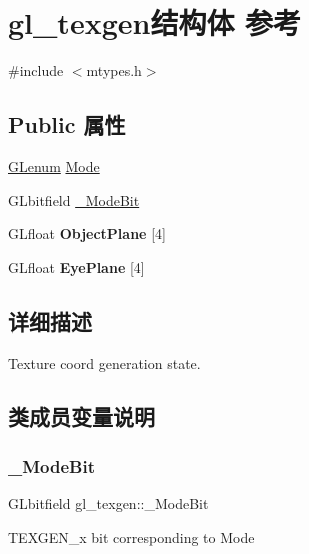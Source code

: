 \hypertarget{structgl__texgen}{}\section{gl\+\_\+texgen结构体 参考}
\label{structgl__texgen}


{\ttfamily \#include $<$mtypes.\+h$>$}

\subsection*{Public 属性}
\begin{DoxyCompactItemize}
\item 
\hyperlink{interfacevoid}{G\+Lenum} \hyperlink{structgl__texgen_affe19d424ce41dbf80035954eaa51fda}{Mode}
\item 
G\+Lbitfield \hyperlink{structgl__texgen_ae1da13c915be745053d632cd94abebc5}{\+\_\+\+Mode\+Bit}
\item 
\mbox{\label{structgl__texgen_adfca0b6148f294a89ccbc20b41dbdaf3}} 
G\+Lfloat {\bfseries Object\+Plane} \mbox{[}4\mbox{]}
\item 
\mbox{\label{structgl__texgen_ac0db03b2794ad79c8c9402f5d3081355}} 
G\+Lfloat {\bfseries Eye\+Plane} \mbox{[}4\mbox{]}
\end{DoxyCompactItemize}


\subsection{详细描述}
Texture coord generation state. 

\subsection{类成员变量说明}
\mbox{\label{structgl__texgen_ae1da13c915be745053d632cd94abebc5}} 
\subsubsection{\texorpdfstring{\+\_\+\+Mode\+Bit}{\_ModeBit}}
{\footnotesize\ttfamily G\+Lbitfield gl\+\_\+texgen\+::\+\_\+\+Mode\+Bit}

T\+E\+X\+G\+E\+N\+\_\+x bit corresponding to Mode \mbox{\label{structgl__texgen_affe19d424ce41dbf80035954eaa51fda}} 
